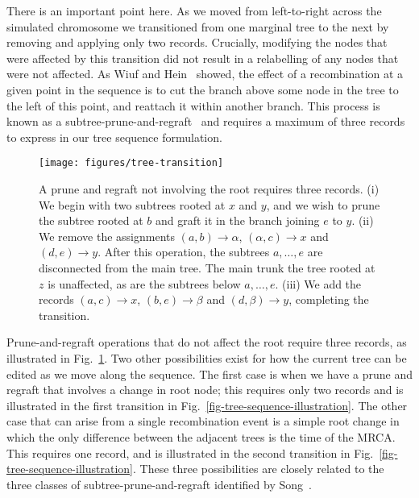 \documentclass[10pt,letterpaper]{article}
\begin{document}
There is an important point here. As we moved from left-to-right across the
simulated chromosome we transitioned from one marginal tree to the next by
removing and applying only two records. Crucially, modifying the nodes that
were affected by this transition did not result in a relabelling of any
nodes that were not affected.
As Wiuf and Hein~\citep{wh99,wh99b} showed, the effect of a
recombination at a given point in the sequence is to cut the branch above some
node in the tree to the left of this point, and reattach it within another
branch. This process is known as a subtree-prune-and-regraft~\citep{s03,s06}
and requires a maximum of three records to express in our tree sequence
formulation.

\begin{figure}
    \begin{center}
    \texttt{[image: figures/tree-transition]}
    \end{center}
    \caption{\label{fig-tree-transition} A prune and regraft not involving the
    root requires three records.
    (i) We begin with two subtrees rooted at $x$ and $y$, and we
    wish to prune the subtree rooted at $b$ and graft it in the branch
    joining $e$ to $y$.
    (ii) We remove the assignments $(a, b)\rightarrow \alpha$,
    $(\alpha, c) \rightarrow x$ and $(d, e) \rightarrow y$. After this operation,
    the subtrees $a,\dots,e$ are disconnected from the main tree. The main trunk
    the tree rooted at $z$ is unaffected, as are the subtrees below $a, \dots, e$.
    (iii) We add the records $(a ,c) \rightarrow x$,
    $(b, e) \rightarrow \beta$ and $(d, \beta) \rightarrow y$, completing the
    transition.
    }
\end{figure}

Prune-and-regraft operations that do not affect the root
require three records, as illustrated in Fig.~\ref{fig-tree-transition}.
Two other possibilities exist
for how the current tree can be edited as we move along the sequence. The first
case is when we have a prune and regraft that involves a change in root
node; this requires only two records and is illustrated in the first transition
in Fig.~\ref{fig-tree-sequence-illustration}. The other case that
can arise from a single recombination event is a simple root change in which
the only difference between the adjacent trees is the time of the MRCA. This
requires one record, and is illustrated in the second
transition in Fig.~\ref{fig-tree-sequence-illustration}. These three
possibilities are closely related to the three classes of
subtree-prune-and-regraft identified by Song~\citep{s03,s06}.
\end{document}
